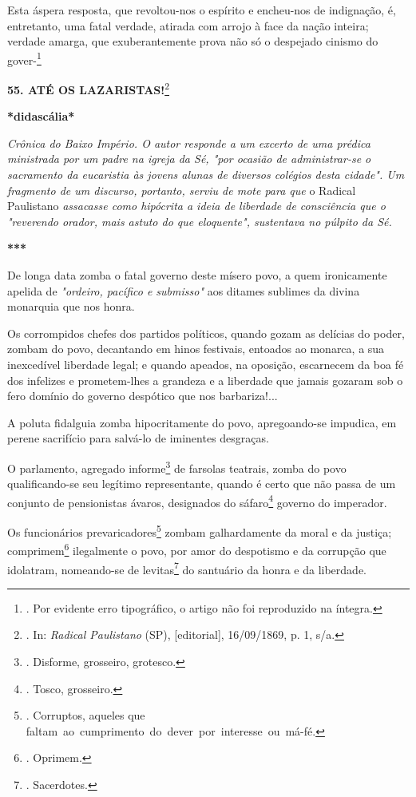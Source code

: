 Esta áspera resposta, que revoltou-nos o espírito e encheu-nos de
indignação, é, entretanto, uma fatal verdade, atirada com arrojo à face
da nação inteira; verdade amarga, que exuberantemente prova não só o
despejado cinismo do gover-\footnote{. Por evidente erro tipográfico, o
  artigo não foi reproduzido na íntegra.}

\textbf{55. ATÉ OS LAZARISTAS!}\footnote{. In: \emph{Radical Paulistano}
  (SP), {[}editorial{]}, 16/09/1869, p. 1, s/a.}

\textbf{*didascália*}

\emph{Crônica do Baixo Império. O autor responde a um excerto de uma
prédica ministrada por um padre na igreja da Sé, "por ocasião de
administrar-se o sacramento da eucaristia às jovens alunas de diversos
colégios desta cidade". Um fragmento de um discurso, portanto, serviu de
mote para que} o Radical Paulistano \emph{assacasse como hipócrita a
ideia de liberdade de consciência que o "reverendo orador, mais astuto
do que eloquente", sustentava no púlpito da Sé.}

\textbf{***}

De longa data zomba o fatal governo deste mísero povo, a quem
ironicamente apelida de \emph{"ordeiro, pacífico e submisso"} aos
ditames sublimes da divina monarquia que nos honra.

Os corrompidos chefes dos partidos políticos, quando gozam as delícias
do poder, zombam do povo, decantando em hinos festivais, entoados ao
monarca, a sua inexcedível liberdade legal; e quando apeados, na
oposição, escarnecem da boa fé dos infelizes e prometem-lhes a grandeza
e a liberdade que jamais gozaram sob o fero domínio do governo despótico
que nos barbariza!...

A poluta fidalguia zomba hipocritamente do povo, apregoando-se impudica,
em perene sacrifício para salvá-lo de iminentes desgraças.

O parlamento, agregado informe\footnote{. Disforme, grosseiro, grotesco.}
de farsolas teatrais, zomba do povo qualificando-se seu legítimo
representante, quando é certo que não passa de um conjunto de
pensionistas ávaros, designados do sáfaro\footnote{. Tosco, grosseiro.}
governo do imperador.

Os funcionários prevaricadores\footnote{. Corruptos, aqueles que
  faltam~ao~cumprimento~do~dever~por~interesse~ou~má-fé.} zombam
galhardamente da moral e da justiça; comprimem\footnote{. Oprimem.}
ilegalmente o povo, por amor do despotismo e da corrupção que idolatram,
nomeando-se de levitas\footnote{. Sacerdotes.} do santuário da honra e
da liberdade.

